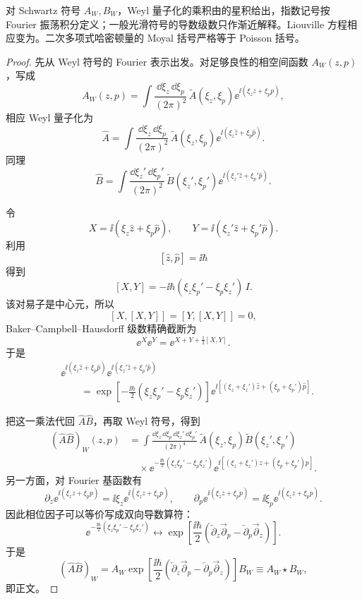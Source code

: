 \begin{theorem}
对 Schwartz 符号 $A_W,B_W$，Weyl 量子化的乘积由的星积给出，指数记号按 Fourier 振荡积分定义；一般光滑符号的导数级数只作渐近解释。Liouville 方程相应变为。二次多项式哈密顿量的 Moyal 括号严格等于 Poisson 括号。
\end{theorem}
\begin{proof}
先从 Weyl 符号的 Fourier 表示出发。对足够良性的相空间函数 \(A_W(z,p)\)，写成
\[
A_W(z,p)
=
\int\frac{\dd\xi_z\,\dd\xi_p}{(2\pi)^2}\,
\widetilde A(\xi_z,\xi_p)
\ee^{\ii(\xi_z z+\xi_p p)},
\]
相应 Weyl 量子化为
\[
\hat A
=
\int\frac{\dd\xi_z\,\dd\xi_p}{(2\pi)^2}\,
\widetilde A(\xi_z,\xi_p)
\ee^{\ii(\xi_z\hat z+\xi_p\hat p)}.
\]
同理
\[
\hat B
=
\int\frac{\dd\xi_z'\,\dd\xi_p'}{(2\pi)^2}\,
\widetilde B(\xi_z',\xi_p')
\ee^{\ii(\xi_z'\hat z+\xi_p'\hat p)}.
\]

令
\[
X=\ii(\xi_z\hat z+\xi_p\hat p),
\qquad
Y=\ii(\xi_z'\hat z+\xi_p'\hat p).
\]
利用
\[
[\hat z,\hat p]=\ii\hbar
\]
得到
\[
[X,Y]
=
-\ii\hbar
(\xi_z\xi_p'-\xi_p\xi_z')\,I.
\]
该对易子是中心元，所以
\[
[X,[X,Y]]
=
[Y,[X,Y]]
=0,
\]
Baker--Campbell--Hausdorff 级数精确截断为
\[
\ee^X\ee^Y
=
\ee^{X+Y+\frac12[X,Y]}.
\]
于是
\begin{align*}
&\ee^{\ii(\xi_z\hat z+\xi_p\hat p)}
\ee^{\ii(\xi_z'\hat z+\xi_p'\hat p)}\\
&\qquad=
\exp\!\left[
-\frac{\ii\hbar}{2}
(\xi_z\xi_p'-\xi_p\xi_z')
\right]
\ee^{\ii[(\xi_z+\xi_z')\hat z+(\xi_p+\xi_p')\hat p]}.
\end{align*}

把这一乘法代回 \(\hat A\hat B\)，再取 Weyl 符号，得到
\begin{align*}
(\hat A\hat B)_W(z,p)
&=
\int
\frac{\dd\xi_z\,\dd\xi_p\,\dd\xi_z'\,\dd\xi_p'}{(2\pi)^4}\,
\widetilde A(\xi_z,\xi_p)
\widetilde B(\xi_z',\xi_p')\\
&\quad\times
\ee^{-\frac{\ii\hbar}{2}(\xi_z\xi_p'-\xi_p\xi_z')}
\ee^{\ii[(\xi_z+\xi_z')z+(\xi_p+\xi_p')p]}.
\end{align*}
另一方面，对 Fourier 基函数有
\[
\partial_z
\ee^{\ii(\xi_z z+\xi_p p)}
=
\ii\xi_z
\ee^{\ii(\xi_z z+\xi_p p)},
\qquad
\partial_p
\ee^{\ii(\xi_z z+\xi_p p)}
=
\ii\xi_p
\ee^{\ii(\xi_z z+\xi_p p)}.
\]
因此相位因子可以等价写成双向导数算符：
\[
\ee^{-\frac{\ii\hbar}{2}(\xi_z\xi_p'-\xi_p\xi_z')}
\longleftrightarrow
\exp\!\left[
\frac{\ii\hbar}{2}
\left(
\overleftarrow\partial_z\overrightarrow\partial_p
-
\overleftarrow\partial_p\overrightarrow\partial_z
\right)
\right].
\]
于是
\[
{
(\hat A\hat B)_W
=
A_W
\exp\!\left[
\frac{\ii\hbar}{2}
\left(
\overleftarrow\partial_z\overrightarrow\partial_p
-
\overleftarrow\partial_p\overrightarrow\partial_z
\right)
\right]
B_W
\equiv A_W\star B_W,
}
\]
即正文。


\end{proof}
